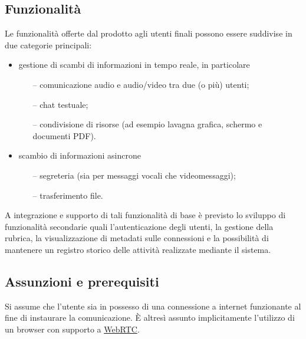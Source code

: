 \subsection{Funzionalità}
Le funzionalità offerte dal prodotto agli utenti finali possono essere suddivise in due categorie principali:
\begin{itemize}
  \item gestione di scambi di informazioni in tempo reale, in particolare
  \begin{itemize}
  \item[--] comunicazione audio e audio/video tra due (o più) utenti;
  \item[--] chat testuale;
  \item[--] condivisione di risorse (ad esempio lavagna grafica, schermo e documenti PDF). 
  \end{itemize}
  \item scambio di informazioni asincrone 
  \begin{itemize}
  \item[--] segreteria (sia per messaggi vocali che videomessaggi);
  \item[--] trasferimento file.
  \end{itemize}
\end{itemize}
A integrazione e supporto di tali funzionalità di base è previsto lo sviluppo di funzionalità secondarie quali l'autenticazione degli utenti, la gestione della rubrica, la visualizzazione di metadati sulle connessioni e la possibilità di mantenere un registro storico delle attività realizzate mediante il sistema.

\subsection{Assunzioni e prerequisiti}
Si assume che l'utente sia in possesso di una connessione a internet funzionante al fine di instaurare la comunicazione. È altresì assunto implicitamente l'utilizzo di un browser con supporto a \underline{WebRTC}.

\clearpage




